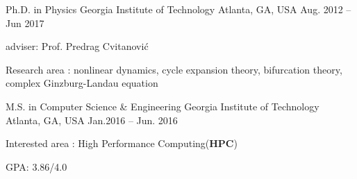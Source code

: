 


\begin{cventries}

\cveducation
{Ph.D. in Physics}
{Georgia Institute of Technology}
{Atlanta, GA, USA}
{Aug. 2012 -- Jun 2017}
{
  \begin{cvitems}
    \item adviser: Prof. Predrag Cvitanovi\'c
    \item Research area : nonlinear dynamics, cycle expansion theory, bifurcation theory,
      complex Ginzburg-Landau equation
  \end{cvitems}
}


\cveducation
{M.S. in Computer Science \& Engineering }
{Georgia Institute of Technology}
{Atlanta, GA, USA}
{Jan.2016 -- Jun. 2016}
{
  \begin{cvitems}
    \item Interested area : High Performance Computing(\textbf{HPC})
    \item GPA: 3.86/4.0
  \end{cvitems}
}





\end{cventries}
